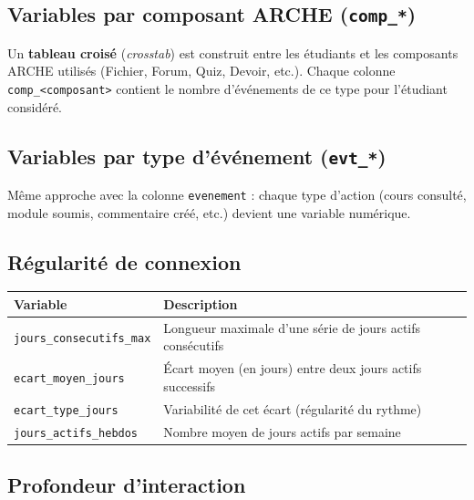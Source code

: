 \documentclass[12pt, a4paper, french]{report}
\begin{document}
\subsection{Variables par composant ARCHE (\texttt{comp\_*})}

Un \textbf{tableau croisé} (\textit{crosstab}) est construit entre les étudiants et les composants ARCHE utilisés (Fichier, Forum, Quiz, Devoir, etc.).
Chaque colonne \texttt{comp\_<composant>} contient le nombre d'événements de ce type pour l'étudiant considéré.

\subsection{Variables par type d'événement (\texttt{evt\_*})}

Même approche avec la colonne \texttt{evenement} : chaque type d'action (cours consulté, module soumis, commentaire créé, etc.) devient une variable numérique.

\subsection{Régularité de connexion}

\begin{center}
\begin{tabular}{lp{8cm}}
\toprule
\textbf{Variable} & \textbf{Description}\\
\midrule
\texttt{jours\_consecutifs\_max} & Longueur maximale d'une série de jours actifs consécutifs\\
\texttt{ecart\_moyen\_jours}     & Écart moyen (en jours) entre deux jours actifs successifs\\
\texttt{ecart\_type\_jours}      & Variabilité de cet écart (régularité du rythme)\\
\texttt{jours\_actifs\_hebdos}   & Nombre moyen de jours actifs par semaine\\
\bottomrule
\end{tabular}
\end{center}

\subsection{Profondeur d'interaction}
\end{document}
